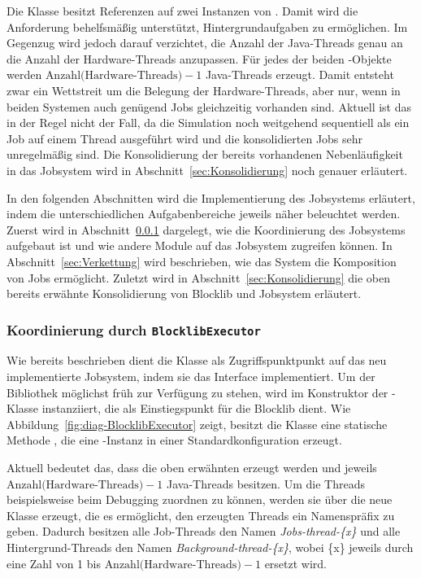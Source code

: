 Die Klasse \classBlocklibExecutor{} besitzt Referenzen auf zwei Instanzen von \classScheduledThreadPoolExecutor{}. Damit wird die Anforderung behelfsmäßig unterstützt, Hintergrundaufgaben zu ermöglichen. Im Gegenzug wird jedoch darauf verzichtet, die Anzahl der Java-Threads genau an die Anzahl der Hardware-Threads anzupassen. Für jedes der beiden \classScheduledThreadPoolExecutor{}-Objekte werden $\text{Anzahl(Hardware-Threads)} - 1$ Java-Threads erzeugt. Damit entsteht zwar ein Wettstreit um die Belegung der Hardware-Threads, aber nur, wenn in beiden Systemen auch genügend Jobs gleichzeitig vorhanden sind. Aktuell ist das in der Regel nicht der Fall, da die Simulation noch weitgehend sequentiell als ein Job auf einem Thread ausgeführt wird und die konsolidierten Jobs sehr unregelmäßig sind. Die Konsolidierung der bereits vorhandenen Nebenläufigkeit in das Jobsystem wird in Abschnitt~\ref{sec:Konsolidierung} noch genauer erläutert. 

In den folgenden Abschnitten wird die Implementierung des Jobsystems erläutert, indem die unterschiedlichen Aufgabenbereiche jeweils näher beleuchtet werden. Zuerst wird in Abschnitt~\ref{sec:Koordinierung} dargelegt, wie die Koordinierung des Jobsystems aufgebaut ist und wie andere Module auf das Jobsystem zugreifen können. In Abschnitt~\ref{sec:Verkettung} wird beschrieben, wie das System die Komposition von Jobs ermöglicht. Zuletzt wird in Abschnitt~\ref{sec:Konsolidierung} die oben bereits erwähnte Konsolidierung von Blocklib und Jobsystem erläutert.

\subsubsection{Koordinierung durch \texttt{BlocklibExecutor}}\label{sec:Koordinierung}

Wie bereits beschrieben dient die Klasse \classBlocklibExecutor{} als Zugriffspunktpunkt auf das neu implementierte Jobsystem, indem sie das Interface \classBlocklibExecutorService{} implementiert. Um der Bibliothek möglichst früh zur Verfügung zu stehen, wird \classBlocklibExecutor{} im Konstruktor der \classGame{}-Klasse instanziiert, die als Einstiegspunkt für die Blocklib dient. Wie Abbildung~\ref{fig:diag-BlocklibExecutor} zeigt, besitzt die Klasse \classBlocklibExecutor{} eine statische Methode , die eine \classBlocklibExecutor{}-Instanz in einer Standardkonfiguration erzeugt.

Aktuell bedeutet das, dass die oben erwähnten \classScheduledThreadPoolExecutor{} erzeugt werden und jeweils $\text{Anzahl(Hardware-Threads)} - 1$ Java-Threads besitzen. Um die Threads beispielsweise beim Debugging zuordnen zu können, werden sie über die neue Klasse \classNamedThreadFactory{} erzeugt, die es ermöglicht, den erzeugten Threads ein Namenspräfix zu geben. Dadurch besitzen alle Job-Threads den Namen \emph{Jobs-thread-\{x\}} und alle Hintergrund-Threads den Namen \emph{Background-thread-\{x\}}, wobei \{x\} jeweils durch eine Zahl von 1 bis $\text{Anzahl(Hardware-Threads)} - 1$ ersetzt wird.

